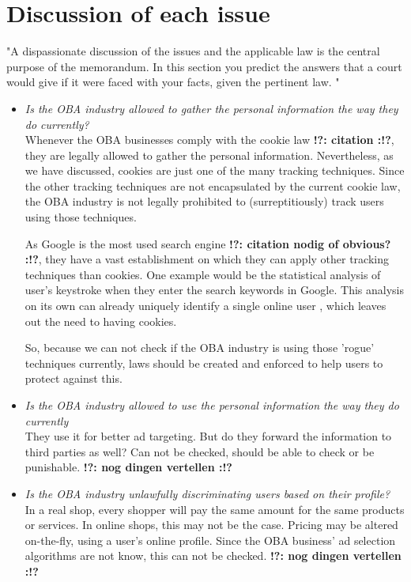 \documentclass[11pt]{article}
\newcommand{\tocheck}[1]{{\bf !?: #1 :!?}}
\begin{document}
\section{Discussion of each issue}
"A dispassionate discussion of the issues and the applicable law is the central purpose of
the memorandum. In this section you predict the answers that a court would give if it
were faced with your facts, given the pertinent law.
"
\begin{itemize}
	\item \textit{Is the OBA industry allowed to gather the personal information the way they do currently?}\\
			Whenever the OBA businesses comply with the cookie law \cite{blabla} \tocheck{citation}, they are legally allowed to gather the personal information. Nevertheless, as we have discussed, cookies are just one of the many tracking techniques. Since the other tracking techniques are not encapsulated by the current cookie law, the OBA industry is not legally prohibited to (surreptitiously) track users using those techniques. 

			As Google is the most used search engine \tocheck{citation nodig of obvious?}, they have a vast establishment on which they can apply other tracking techniques than cookies. One example would be the statistical analysis of user's keystroke when they enter the search keywords in Google. This analysis on its own can already uniquely identify a single online user \cite{keystroke}, which leaves out the need to having cookies.

			So, because we can not check if the OBA industry is using those 'rogue' techniques currently, laws should be created and enforced to help users to protect against this.


	\item \textit{Is the OBA industry allowed to use the personal information the way they do currently}\\
				They use it for better ad targeting. But do they forward the information to third parties as well? Can not be checked, should be able to check or be punishable. \tocheck{nog dingen vertellen}

	\item \textit{Is the OBA industry unlawfully discriminating users based on their profile?}\\
			In a real shop, every shopper will pay the same amount for the same products or services. In online shops, this may not be the case. Pricing may be altered on-the-fly, using a user's online profile. Since the OBA business' ad selection algorithms are not know, this can not be checked. \tocheck{nog dingen vertellen}

\end{itemize}
\end{document}
